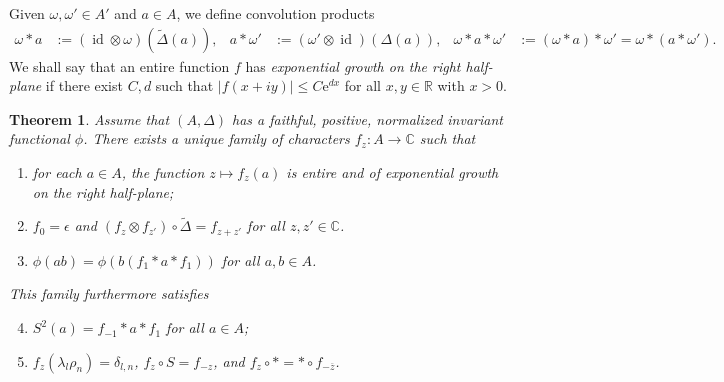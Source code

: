 \documentclass[12pt]{article}
\theoremstyle{change}
\DeclareMathOperator{\id}{id}
\newcommand{\C}{\mathbb{C}}
\newcommand{\R}{\mathbb{R}}
\newtheorem{Theorem}{Theorem}[section]
\theoremstyle{definition}
\numberwithin{equation}{section}
\begin{document}
Given $\omega,\omega' \in A'$ and $a \in A$, we define convolution
products
\begin{align*}
  \omega \ast a
&:= (\id \otimes \omega) (\tilde \Delta(a)), & a \ast
\omega'&:=(\omega' \otimes \id)(\Delta(a)), & \omega \ast a \ast
\omega'&:= (\omega \ast a)\ast \omega' = \omega \ast (a \ast \omega').\end{align*}
We shall say that an entire function $f$ has \emph{exponential growth
  on the right half-plane} if there exist $C,d$ such that $|f(x+iy)|\leq
C\mathrm{e}^{dx}$  for all $x,y\in \R$ with $x>0$. 
\begin{Theorem} \label{thm:rep-characters}
  Assume that $(A,\Delta)$ has a faithful, positive, normalized
  invariant functional $\phi$.  There exists a unique family of characters
  $f_{z} \colon A\to \C$ such that
  \begin{enumerate}
  \item for each $a\in A$, the function $z\mapsto f_{z}(a)$ is entire
    and of exponential growth on the right half-plane;
  \item $f_{0} = \epsilon$ and $(f_{z} \otimes f_{z'}) \circ \tilde
    \Delta= f_{z+z'}$ for all $z,z' \in \C$.
  \item $\phi(ab)=\phi(b(f_{1} \ast a \ast f_{1}))$ for all $a,b\in A$.
  \end{enumerate}
  This family furthermore satisfies
  \begin{enumerate}\setcounter{enumi}{3}
  \item $S^{2}(a)=f_{-1} \ast a \ast f_{1}$ for all $a\in A$;
  \item $f_{z}(\lambda_{l}\rho_{n})=\delta_{l,n}$,  $f_{z} \circ S = f_{-z}$,
and    $f_{z} \circ \ast = \ast \circ f_{-\overline{z}}$.
\end{enumerate}
\end{Theorem}
\end{document}
